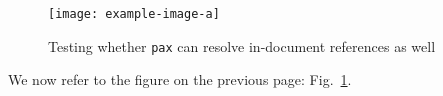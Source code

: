 \documentclass{article}
\begin{document}
	
	\begin{figure}
		\centering
		\texttt{[image: example-image-a]}
		\caption{Testing whether \texttt{pax} can resolve in-document references as well}
		\label{fig:example-image}
	\end{figure}
	
	\clearpage %
	
	We now refer to the figure on the previous page: Fig.~\ref{fig:example-image}.
	
\end{document}
